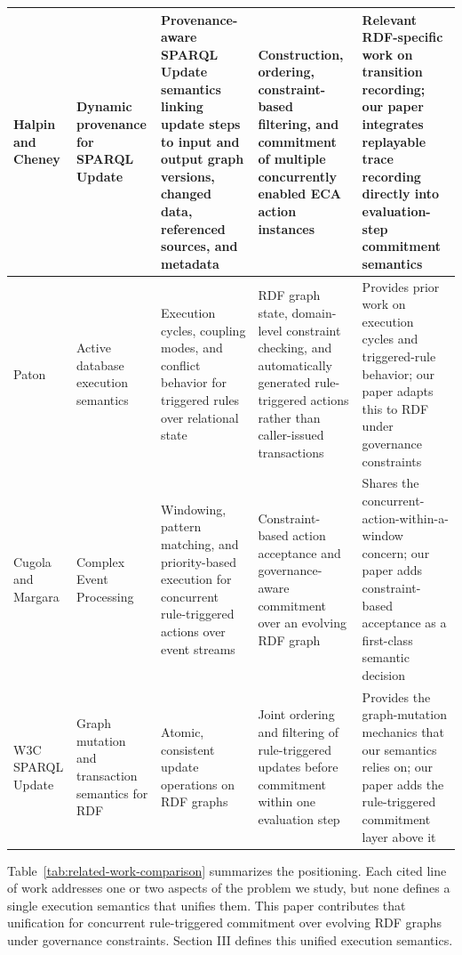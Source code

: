 \documentclass{ieeeaccess}
\theoremstyle{definition}
\theoremstyle{plain}
\theoremstyle{remark}
\begin{document}
\begin{table}[!t]
\begin{tabular}{|p{1.5cm}|p{2.0cm}|p{4.3cm}|p{4.3cm}|p{3.9cm}|}
Halpin and Cheney \cite{Halpin2014SPARQLProvenance} & Dynamic provenance for SPARQL Update & Provenance-aware SPARQL Update semantics linking update steps to input and output graph versions, changed data, referenced sources, and metadata & Construction, ordering, constraint-based filtering, and commitment of multiple concurrently enabled ECA action instances & Relevant RDF-specific work on transition recording; our paper integrates replayable trace recording directly into evaluation-step commitment semantics \\
\hline
Paton \cite{Paton1999ActiveDatabaseSystems} & Active database execution semantics & Execution cycles, coupling modes, and conflict behavior for triggered rules over relational state & RDF graph state, domain-level constraint checking, and automatically generated rule-triggered actions rather than caller-issued transactions & Provides prior work on execution cycles and triggered-rule behavior; our paper adapts this to RDF under governance constraints \\
\hline

Cugola and Margara \cite{CugolaMargara2012CEP} & Complex Event Processing & Windowing, pattern matching, and priority-based execution for concurrent rule-triggered actions over event streams & Constraint-based action acceptance and governance-aware commitment over an evolving RDF graph & Shares the concurrent-action-within-a-window concern; our paper adds constraint-based acceptance as a first-class semantic decision \\
\hline

W3C SPARQL Update \cite{SPARQL11Update} & Graph mutation and transaction semantics for RDF & Atomic, consistent update operations on RDF graphs & Joint ordering and filtering of rule-triggered updates before commitment within one evaluation step & Provides the graph-mutation mechanics that our semantics relies on; our paper adds the rule-triggered commitment layer above it \\
\hline
\end{tabular}
\end{table}

Table~\ref{tab:related-work-comparison} summarizes the positioning. Each cited line of work addresses one or two aspects of the problem we study, but none defines a single execution semantics that unifies them. This paper contributes that unification for concurrent rule-triggered commitment over evolving RDF graphs under governance constraints. Section III defines this unified execution semantics.
\end{document}

